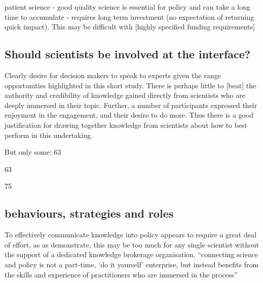 patient science - good quality science is essential for policy and can take a long time to accumulate - requires long term investment (no expectation of returning quick impact). This may be difficult with [highly specified funding requirements]

\subsection{Should scientists be involved at the interface?}
Clearly desire for decision makers to speak to experts given the range opportunities highlighted in this short study. There is perhaps little to [beat] the  authority and credibility of knowledge gained directly from scientists who are deeply immersed in their topic. Further, a number of participants expressed their enjoyment in the engagement, and their desire to do more. Thus there is a good justification for drawing together knowledge from scientists about how to best perform in this undertaking.

But only some: 63

63

75

\subsection{behaviours, strategies and roles}
To effectively communicate knowledge into policy appears to require a great deal of effort, as as \textcite{BednarekSHG2015} demonstrate, this may be too much for any single scientist without the support of a dedicated knowledge brokerage organisation. ``connecting science and policy is not a part-time, `do it yourself' enterprise, but instead benefits from the skills and experience of practitioners who are immersed in the process''

